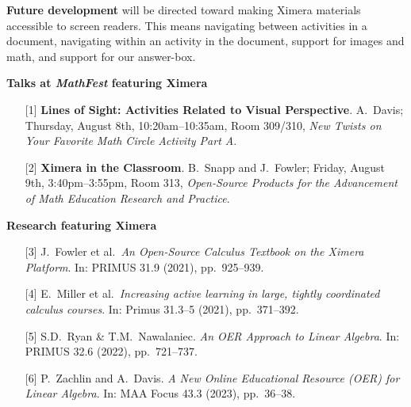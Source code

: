 \documentclass[twocolumn]{article}
\makeatletter
\newcommand{\mylabel}[2]{#2\def\@currentlabel{#2}\label{#1}}
\makeatother
\begin{document}
\begin{xframe}
    {\sffamily\bfseries Future development} will be directed toward making
    Ximera materials accessible to screen readers. This means navigating
    between activities in a document, navigating within an activity in the
    document, support for images and math, and support for our answer-box.
\end{xframe}
\restoregeometry

\begin{xframe}
    {\sffamily\bfseries Talks at \textsl{MathFest} featuring Ximera}
    \begin{itemize}
        \item[{[1]}] \textbf{Lines of Sight: Activities Related to Visual
            Perspective}. A.\ Davis; Thursday, August 8th,
        10:20am--10:35am,
        Room 309/310,
        \textit{New Twists on Your Favorite Math Circle Activity Part A}.
        \item[{[2]}] \textbf{Ximera in the Classroom}. B.\ Snapp and J.\
        Fowler;
        Friday, August 9th, 3:40pm--3:55pm, Room 313, \textit{Open-Source
            Products for
            the Advancement of Math Education Research and Practice}.
    \end{itemize}
\end{xframe}

\begin{xframe}
    {\sffamily\bfseries Research featuring Ximera}
    \begin{itemize}
        \item[\mylabel{F21}{[3]}] J.\ Fowler et al.\ \textit{An Open-Source
            Calculus
            Textbook on the Ximera Platform}. In:
        PRIMUS 31.9 (2021), pp.\ 925--939. %
        \item[{[4]}] E.\ Miller et al.\ \textit{Increasing active learning in
            large, tightly coordinated calculus courses}. In: Primus 31.3--5
        (2021), pp.\
        371--392.
        \item[{[5]}]S.D.\ Ryan \& T.M.\ Nawalaniec. \textit{An OER Approach to
            Linear Algebra}. In: PRIMUS 32.6 (2022), pp.\ 721--737.
        \item[{[6]}] P.\ Zachlin and A.\ Davis. \textit{A New Online
            Educational Resource (OER)
            for Linear Algebra}. In: MAA Focus 43.3 (2023), pp.\ 36--38.
    \end{itemize}
\end{xframe}
\end{document}
